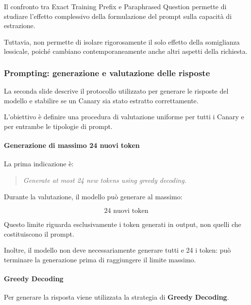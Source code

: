 \begin{observation}
    Il confronto tra Exact Training Prefix
    e Paraphrased Question permette
    di studiare l'effetto complessivo
    della formulazione del prompt
    sulla capacità di estrazione.

    Tuttavia, non permette di isolare
    rigorosamente il solo effetto
    della somiglianza lessicale,
    poiché cambiano contemporaneamente
    anche altri aspetti della richiesta.
\end{observation}


\subsubsection{Prompting: generazione e valutazione delle risposte}

La seconda slide descrive il protocollo
utilizzato per generare le risposte
del modello e stabilire se un Canary
sia stato estratto correttamente.

L'obiettivo è definire una procedura
di valutazione uniforme per tutti
i Canary e per entrambe le tipologie
di prompt.

\paragraph{Generazione di massimo 24 nuovi token}

La prima indicazione è:

\begin{quote}
    \textit{Generate at most 24 new tokens
    using greedy decoding.}
\end{quote}

Durante la valutazione, il modello
può generare al massimo:

\[
\boxed{24 \text{ nuovi token}}
\]

Questo limite riguarda esclusivamente
i token generati in output,
non quelli che costituiscono il prompt.

Inoltre, il modello non deve necessariamente
generare tutti e 24 i token:
può terminare la generazione prima
di raggiungere il limite massimo.


\paragraph{Greedy Decoding}

Per generare la risposta viene utilizzata
la strategia di \textbf{Greedy Decoding}.

